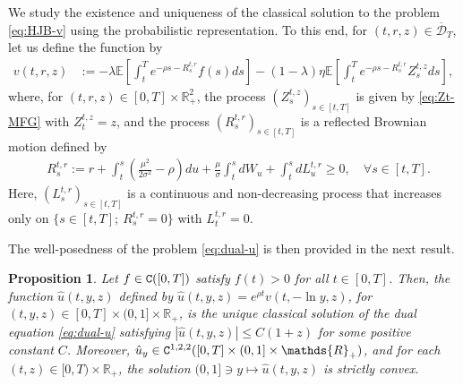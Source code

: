 \documentclass[11pt,times,letter]{article}
\newcommand{\Ex}{ \mathbb{E} }
\newcommand{\R}{\mathds{R}}
\newcommand{\C}{{\tt{C}}}
\numberwithin{equation}{section}
\newtheorem{proposition}[theorem]{Proposition}
\begin{document}
We study the existence and uniqueness of the classical solution to the problem \eqref{eq:HJB-v} using the probabilistic representation. To this end, for $(t, r,z) \in \overline{\mathcal{D}}_T$, let us define the function by
\begin{align}\label{eq:v}
v(t,r,z)&:=-\lambda\Ex\left[ \int_t^Te^{-\rho s-R^{t,r}_s}f(s) ds\right]-(1-\lambda)\eta\Ex\left[ \int_t^Te^{-\rho s-R^{t,r}_s}Z_s^{t,z} ds\right],
\end{align}
where, for $(t,r,z)\in  [0,T]\times\R_+^2$, the process $(Z_s^{t,z})_{s\in [t,T]}$ is given by \eqref{eq:Zt-MFG} with $Z_t^{t,z}=z$, and the process $(R_s^{t,r})_{s\in [t,T]}$ is a reflected Brownian motion defined by
\begin{align}\label{eq:R}
&R_s^{t,r}:=r+\int_t^s \left(\frac{\mu^2}{2\sigma^2}-\rho\right)du+\frac{\mu}{\sigma}\int_t^s dW_u+\int_t^s dL_u^{t,r}\geq 0,\quad \forall s\in[t,T].
\end{align}
Here, $(L_s^{t, r})_{s\in [t,T]}$ is a continuous and non-decreasing process that increases only on $\{s \in[t, T];~R_s^{t, r}=0\}$ with $L_t^{t, r}=0$. 







The well-posedness of the problem \eqref{eq:dual-u} is then provided in the next result.
\begin{proposition}\label{thm:dual-u}
Let $f\in {\C}([0,T])$ satisfy $f(t)>0$ for all $t\in[0,T]$. Then, the function  $\hat{u}(t,y,z)$ defined  by $ \hat{u}\left(t,y,z\right)=e^{\rho t}v(t,-\ln y,z)$, for $(t,y,z)\in[0,T]\times (0,1]\times \R_+$,
is the unique classical solution of the dual equation \eqref{eq:dual-u} satisfying $|\hat{u}(t,y,z)|\leq C(1+z)$ for some positive constant $C$. Moreover, $\hat{u}_y \in\C^{1,2,2}([0,T]\times (0,1]\times\R_+)$, and  for each $(t,z) \in[0, T)\times\R_+ $, the solution $(0,1] \ni y \mapsto \hat{u}(t,y,z)$ is strictly convex.
\end{proposition}
\end{document}
